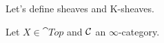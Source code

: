 \documentclass[../thesis.tex]{subfiles}
\begin{document}
Let's define sheaves and K-sheaves.
\begin{definition}\label{sheaf_on_top}
    Let $X \in \cat{Top}$ and $\mathcal{C}$ an $\infty$-category.
\end{definition}
\end{document}
